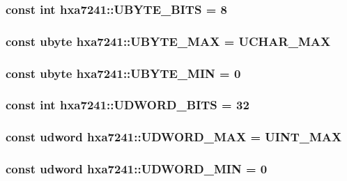 \subsubsection{\setlength{\rightskip}{0pt plus 5cm}const int {\bf hxa7241::UBYTE\_\-BITS} = 8}\label{namespacehxa7241_4ba3d00b9d684194124a3fbff57fcb63}


\subsubsection{\setlength{\rightskip}{0pt plus 5cm}const {\bf ubyte} {\bf hxa7241::UBYTE\_\-MAX} = UCHAR\_\-MAX}\label{namespacehxa7241_7c80885229aeca6dd516ec489663fc12}


\subsubsection{\setlength{\rightskip}{0pt plus 5cm}const {\bf ubyte} {\bf hxa7241::UBYTE\_\-MIN} = 0}\label{namespacehxa7241_985afaf4f35143a7f95b3e637b1b6cdc}


\subsubsection{\setlength{\rightskip}{0pt plus 5cm}const int {\bf hxa7241::UDWORD\_\-BITS} = 32}\label{namespacehxa7241_d8ec726172357b64427005ab7cffd331}


\subsubsection{\setlength{\rightskip}{0pt plus 5cm}const {\bf udword} {\bf hxa7241::UDWORD\_\-MAX} = UINT\_\-MAX}\label{namespacehxa7241_109842b71bd27893c469b44c13210408}


\subsubsection{\setlength{\rightskip}{0pt plus 5cm}const {\bf udword} {\bf hxa7241::UDWORD\_\-MIN} = 0}\label{namespacehxa7241_c0fcca8fbe0376014c9a336023760ffc}


